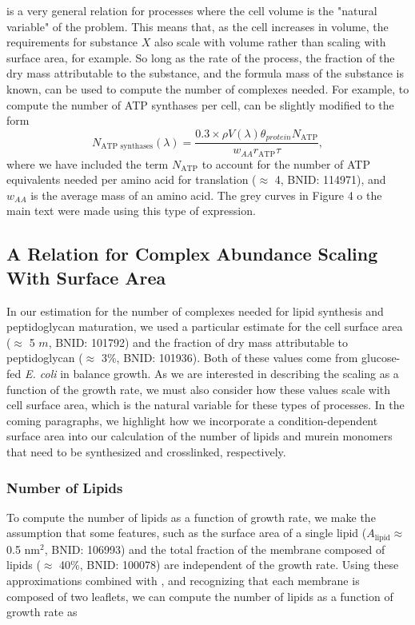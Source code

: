  is a very general relation for processes where the
cell volume is the "natural variable" of the problem. This means that, as the
cell increases in volume, the requirements for substance $X$ also scale with
volume rather than scaling with surface area, for example. So long as the rate
of the process, the fraction of the dry mass attributable to the substance, and
the formula mass of the substance is known,  can be
used to compute the number of complexes needed. For example, to compute the
number of ATP synthases per cell,  can be slightly
modified to the form
\begin{equation}
    N_\text{ATP synthases}(\lambda) = \frac{0.3 \times \rho V(\lambda)\theta_{protein}N_\text{ATP}}{w_{AA} r_\text{ATP} \tau},
\end{equation}
where we have included the term $N_\text{ATP}$ to account for the number of ATP
equivalents needed per amino acid for translation ($\approx$ 4, BNID: 114971),
and $w_{AA}$ is the average mass of an amino acid. The grey curves in Figure 4
o the main text were made using this type of expression.

\subsection{A Relation for Complex Abundance Scaling With Surface Area}
In our estimation for the number of complexes needed for lipid synthesis and
peptidoglycan maturation, we used a particular estimate for the cell surface
area ($\approx$ 5 \textmu$m$, BNID: 101792) and the fraction of dry mass
attributable to peptidoglycan ($\approx$ 3\%, BNID: 101936). Both of these
values come from glucose-fed \textit{E. coli} in balance growth. As we are
interested in describing the scaling as a function of the growth rate, we must
also consider how these values scale with cell surface area, which is the natural
variable for these types of processes. In the coming paragraphs, we highlight
how we incorporate a condition-dependent surface area into our calculation of
the number of lipids and murein monomers that need to be synthesized and
crosslinked, respectively.

\subsubsection{Number of Lipids}
To compute the number of lipids as a function of growth rate, we make the
assumption that some features, such as the surface area of a single lipid
($A_\text{lipid} \approx$ 0.5 nm$^2$, BNID: 106993) and the total fraction of the membrane
composed of lipids ($\approx$ 40\%, BNID: 100078) are independent of the growth
rate. Using these approximations combined with , and
recognizing that each membrane is composed of two leaflets, we can
compute the number of lipids as a function of growth rate as

